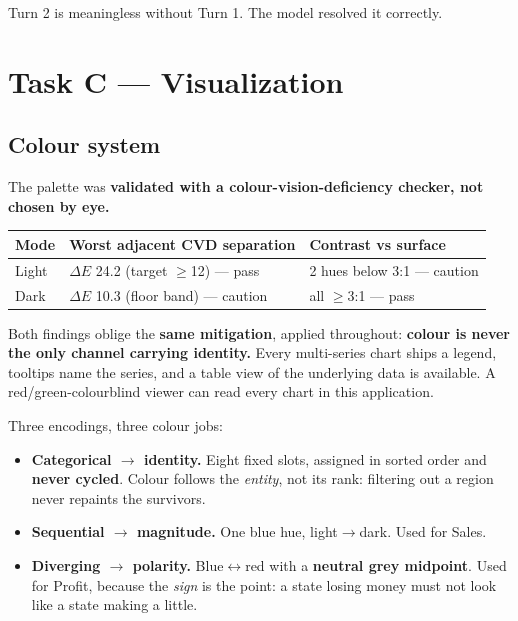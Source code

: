 \documentclass[11pt,a4paper]{article}
\begin{document}
Turn 2 is meaningless without Turn 1. The model resolved it correctly.

\section{Task C --- Visualization}

\subsection{Colour system}

The palette was \textbf{validated with a colour-vision-deficiency checker, not chosen
by eye.}

\begin{center}
\begin{tabular}{@{}lll@{}}
\toprule
\textbf{Mode} & \textbf{Worst adjacent CVD separation} & \textbf{Contrast vs surface} \\
\midrule
Light & $\Delta E$ 24.2 (target $\ge$12) --- pass & 2 hues below 3:1 --- caution \\
Dark  & $\Delta E$ 10.3 (floor band) --- caution   & all $\ge$3:1 --- pass \\
\bottomrule
\end{tabular}
\end{center}

Both findings oblige the \textbf{same mitigation}, applied throughout: \textbf{colour is
never the only channel carrying identity.} Every multi-series chart ships a legend,
tooltips name the series, and a table view of the underlying data is available. A
red/green-colourblind viewer can read every chart in this application.

Three encodings, three colour jobs:

\begin{itemize}[leftmargin=*]
\item \textbf{Categorical $\rightarrow$ identity.} Eight fixed slots, assigned in sorted
      order and \textbf{never cycled}. Colour follows the \emph{entity}, not its rank:
      filtering out a region never repaints the survivors.
\item \textbf{Sequential $\rightarrow$ magnitude.} One blue hue, light$\rightarrow$dark.
      Used for Sales.
\item \textbf{Diverging $\rightarrow$ polarity.} Blue$\leftrightarrow$red with a
      \textbf{neutral grey midpoint}. Used for Profit, because the \emph{sign} is the
      point: a state losing money must not look like a state making a little.
\end{itemize}
\end{document}
